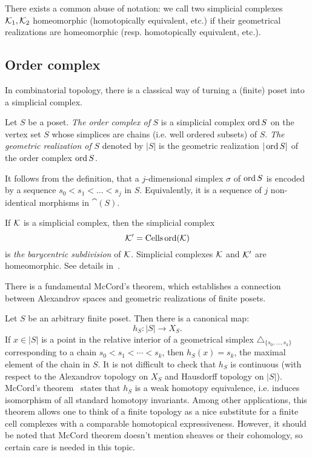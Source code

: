 \begin{rem}\label{remAbuseSimpComp}
There exists a common abuse of notation: we call two simplicial complexes $\mathcal{K}_1,\mathcal{K}_2$ homeomorphic (homotopically equivalent, etc.) if their geometrical realizations are homeomorphic (resp. homotopically equivalent, etc.).
\end{rem}

\subsection{Order complex}

In combinatorial topology, there is a classical way of turning a (finite) poset into a simplicial complex.

\begin{defin}\label{definGeomRealPoset}
Let $S$ be a poset. \emph{The order complex of} $S$ is a simplicial complex $\operatorname{ord} S$ on the vertex set $S$ whose simplices are chains (i.e. well ordered subsets) of $S$. \emph{The geometric realization of} $S$ denoted by $|S|$ is the geometric realization $|\operatorname{ord} S|$ of the order complex $\operatorname{ord} S$.
\end{defin}

\begin{rem}\label{remSimplexOfOrd}
It follows from the definition, that a $j$-dimensional simplex $\sigma$ of $\operatorname{ord} S$ is encoded by a sequence $s_0<s_1<\ldots<s_j$ in $S$. Equivalently, it is a sequence of $j$ non-identical morphisms in $\cat(S)$.
\end{rem}

\begin{rem}\label{remBarycentric}
If $\mathcal{K}$ is a simplicial complex, then the simplicial complex
\[
\mathcal{K}'=\operatorname{Cells}\operatorname{ord}(\mathcal{K})
\]
is \emph{the barycentric subdivision} of $\mathcal{K}$. Simplicial complexes $\mathcal{K}$ and $\mathcal{K}'$ are homeomorphic. See details in~\cite[\S2.1.5]{KozlovBook}.
\end{rem}

There is a fundamental McCord's theorem, which establishes a connection between Alexandrov spaces and geometric realizations of finite posets.

\begin{rem}\label{remMcCord}
Let $S$ be an arbitrary finite poset. Then there is a canonical map:
\[
h_S\colon |S|\to X_S.
\]
If $x\in |S|$ is a point in the relative interior of a geometrical simplex $\triangle_{\{s_0,\ldots,s_k\}}$ corresponding to a chain $s_0<s_1<\cdots<s_k$, then $h_S(x)=s_k$, the maximal element of the chain in $S$. It is not difficult to check that $h_S$ is continuous (with respect to the Alexandrov topology on $X_S$ and Hausdorff topology on $|S|$). McCord's theorem~\cite{McCord} states that $h_S$ is a weak homotopy equivalence, i.e. induces isomorphism of all standard homotopy invariants. Among other applications, this theorem allows one to think of a finite topology as a nice substitute for a finite cell complexes with a comparable homotopical expressiveness. However, it should be noted that McCord theorem doesn't mention sheaves or their cohomology, so certain care is needed in this topic.
\end{rem}

